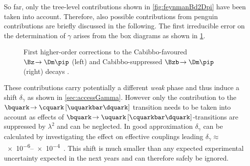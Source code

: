 So far, only the tree-level contributions shown in \cref{fig:feynmanBd2Dpi} have been taken into account.
Therefore, also possible contributions from penguin contributions are briefly discussed in the following.
The first irreducible error on the determination of $\gamma$ arises from the box diagrams as shown in \cref{fig:feynmanBd2DpiPenguin}.
\begin{figure}[tbp]
	\centering
	
	
	\caption{First higher-order corrections to the Cabibbo-favoured $\Bz\!\to\Dm\pip$ (left) and Cabibbo-suppressed $\Bzb\!\to\Dm\pip$ (right) decays \cite{Ellis:2016jkw}.}
	\label{fig:feynmanBd2DpiPenguin}
\end{figure}
These contributions carry potentially a different \emph{weak} phase and thus induce a shift $\delta_\gamma$ as shown in \cref{sec:accessGamma}.
However only the contribution to the $\bquark\!\to\cquark\left[\uquarkbar\dquark\right]$ transition needs to be taken into account as effects of $\bquark\!\to\uquark\left[\cquarkbar\dquark\right]$-transitions are suppressed by $\lambda^2$ and can be neglected.
In good approximation $\delta_\gamma$ can be calculated by investigating the effect on effective couplings leading $\delta_\gamma\approx\,$\numrange{e-6}{e-4}~\cite{Brod:2014qwa}.
This shift is much smaller than any expected experimental uncertainty expected in the next years and can therefore safely be ignored.
